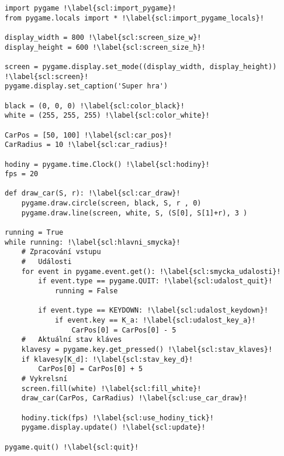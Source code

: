 \begin{minipage}[t]{.45\textwidth}
\begin{code}
\begin{verbatim}
import pygame !\label{scl:import_pygame}!
from pygame.locals import * !\label{scl:import_pygame_locals}!

display_width = 800 !\label{scl:screen_size_w}!
display_height = 600 !\label{scl:screen_size_h}!

screen = pygame.display.set_mode((display_width, display_height)) !\label{scl:screen}!
pygame.display.set_caption('Super hra')

black = (0, 0, 0) !\label{scl:color_black}!
white = (255, 255, 255) !\label{scl:color_white}!

CarPos = [50, 100] !\label{scl:car_pos}!
CarRadius = 10 !\label{scl:car_radius}!

hodiny = pygame.time.Clock() !\label{scl:hodiny}!
fps = 20

def draw_car(S, r): !\label{scl:car_draw}!
    pygame.draw.circle(screen, black, S, r , 0)
    pygame.draw.line(screen, white, S, (S[0], S[1]+r), 3 )

running = True
while running: !\label{scl:hlavni_smycka}!
	# Zpracování vstupu
	# 	Události
    for event in pygame.event.get(): !\label{scl:smycka_udalosti}!
        if event.type == pygame.QUIT: !\label{scl:udalost_quit}!
		    running = False
            
        if event.type == KEYDOWN: !\label{scl:udalost_keydown}!
            if event.key == K_a: !\label{scl:udalost_key_a}!
                CarPos[0] = CarPos[0] - 5
    #	Aktuální stav kláves
    klavesy = pygame.key.get_pressed() !\label{scl:stav_klaves}!  
    if klavesy[K_d]: !\label{scl:stav_key_d}!
    	CarPos[0] = CarPos[0] + 5
    # Vykrelsní    
    screen.fill(white) !\label{scl:fill_white}!
    draw_car(CarPos, CarRadius) !\label{scl:use_car_draw}!
     
    hodiny.tick(fps) !\label{scl:use_hodiny_tick}!
    pygame.display.update() !\label{scl:update}!

pygame.quit() !\label{scl:quit}!
\end{verbatim}

\label{code:grafika_prvni_hybaci}
\end{code}
\end{minipage}
